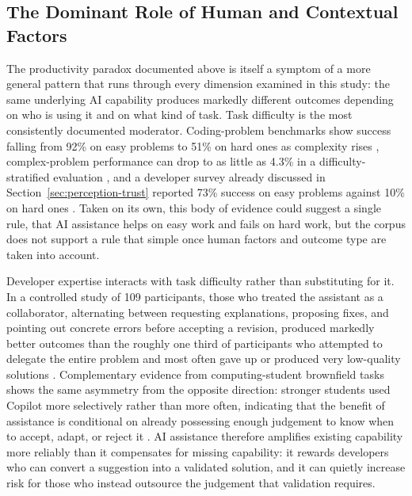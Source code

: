 \subsection{The Dominant Role of Human and Contextual Factors}
\label{sec:disc-human-factors}
The productivity paradox documented above is itself a symptom of a more general pattern that runs through every dimension examined in this study: the same underlying AI capability produces markedly different outcomes depending on who is using it and on what kind of task. Task difficulty is the most consistently documented moderator. Coding-problem benchmarks show success falling from 92\% on easy problems to 51\% on hard ones as complexity rises \cite{li_evaluating_2024}, complex-problem performance can drop to as little as 4.3\% in a difficulty-stratified evaluation \cite{yan_closer_2023}, and a developer survey already discussed in Section~\ref{sec:perception-trust} reported 73\% success on easy problems against 10\% on hard ones \cite{kuhail_will_2024}. Taken on its own, this body of evidence could suggest a single rule, that AI assistance helps on easy work and fails on hard work, but the corpus does not support a rule that simple once human factors and outcome type are taken into account.

Developer expertise interacts with task difficulty rather than substituting for it. In a controlled study of 109 participants, those who treated the assistant as a collaborator, alternating between requesting explanations, proposing fixes, and pointing out concrete errors before accepting a revision, produced markedly better outcomes than the roughly one third of participants who attempted to delegate the entire problem and most often gave up or produced very low-quality solutions \cite{wang_rocks_2024}. Complementary evidence from computing-student brownfield tasks shows the same asymmetry from the opposite direction: stronger students used Copilot more selectively rather than more often, indicating that the benefit of assistance is conditional on already possessing enough judgement to know when to accept, adapt, or reject it \cite{shihab_effects_2025}. AI assistance therefore amplifies existing capability more reliably than it compensates for missing capability: it rewards developers who can convert a suggestion into a validated solution, and it can quietly increase risk for those who instead outsource the judgement that validation requires.

